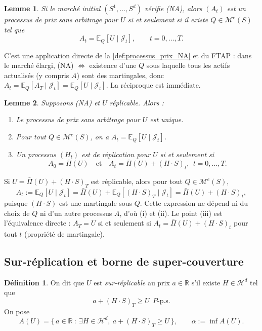 \documentclass[12pt,a4paper]{article}
\makeatletter
\numberwithin{equation}{section}
\theoremstyle{plain} %
\newtheorem{lemme}{Lemme}
\theoremstyle{definition} %
\newtheorem{definition}{Définition}          %
\theoremstyle{remark} %
\theoremstyle{myexample}
\theoremstyle{definition}
\renewenvironment{proof}[1][\proofname]{%
  \par\vspace{0.8em}%
  \pushQED{\qed}%
  \normalfont\color{cyan}%
  \topsep6\p@\@plus6\p@\relax
  \trivlist
  \item[\hskip\labelsep\bfseries\color{cyan}#1\@addpunct{.}]\ignorespaces
}{%
  \popQED\endtrivlist\vspace{0.8em}%
}
\newcommand{\E}{\mathbb{E}}
\newcommand{\RR}{\mathbb{R}}
\makeatother
\begin{document}
\begin{lemme}\label{lem:prix_dynamique_EQ}
Si le marché initial $(S^1,\dots,S^d)$ vérifie (NA), alors $(A_t)$ est un processus de prix
sans arbitrage pour $U$ si et seulement si il existe $Q\in\mathcal{M}^e(S)$ tel que
\[
A_t=\E_Q[U\mid \mathcal{J}_t],\qquad t=0,\dots,T.
\]
\end{lemme}

\begin{proof}
C’est une application directe de la \ref{def:processus_prix_NA} et du FTAP :
dans le marché élargi, (NA) $\Leftrightarrow$ existence d’une $Q$ sous laquelle tous les actifs
actualisés (y compris $A$) sont des martingales, donc $A_t=\E_Q[A_T\mid\mathcal{J}_t]=\E_Q[U\mid\mathcal{J}_t]$.
La réciproque est immédiate.
\end{proof}

\begin{lemme}\label{lem:unicite_processus_si_replicable}
Supposons (NA) et $U$ réplicable. Alors :
\begin{enumerate}
\item[(i)] Le processus de prix sans arbitrage pour $U$ est unique.
\item[(ii)] Pour tout $Q\in\mathcal{M}^e(S)$, on a $A_t=\E_Q[U\mid\mathcal{J}_t]$.
\item[(iii)] Un processus $(H_t)$ est de réplication pour $U$ si et seulement si
\[
A_0=\bar\Pi(U)\quad\text{et}\quad A_t=\bar\Pi(U)+(H\cdot S)_t,\ \ t=0,\dots,T.
\]
\end{enumerate}
\end{lemme}

\begin{proof}
Si $U=\bar\Pi(U)+(H\cdot S)_T$ est réplicable, alors pour tout $Q\in\mathcal{M}^e(S)$,
\[
A_t:=\E_Q[U\mid\mathcal{J}_t]=\bar\Pi(U)+\E_Q[(H\cdot S)_T\mid\mathcal{J}_t]
=\bar\Pi(U)+(H\cdot S)_t,
\]
puisque $(H\cdot S)$ est une martingale sous $Q$. Cette expression ne dépend ni du choix
de $Q$ ni d’un autre processus $A$, d’où (i) et (ii). Le point (iii) est l’équivalence directe :
$A_T=U$ si et seulement si $A_t=\bar\Pi(U)+(H\cdot S)_t$ pour tout $t$ (propriété de martingale).
\end{proof}

\subsection{Sur-réplication et borne de super-couverture}

\begin{definition}
On dit que $U$ est \emph{sur-réplicable} au prix $a\in\RR$ s’il existe $H\in\mathcal{H}^d$ tel que
\[
a + (H\cdot S)_T \ge U\ \ \text{$P$-p.s.}
\]
On pose
\[
A(U)=\big\{\, a\in\RR\ :\ \exists H\in\mathcal{H}^d,\ a+(H\cdot S)_T\ge U \,\big\},
\qquad
\alpha := \inf A(U).
\]
\end{definition}
\end{document}
